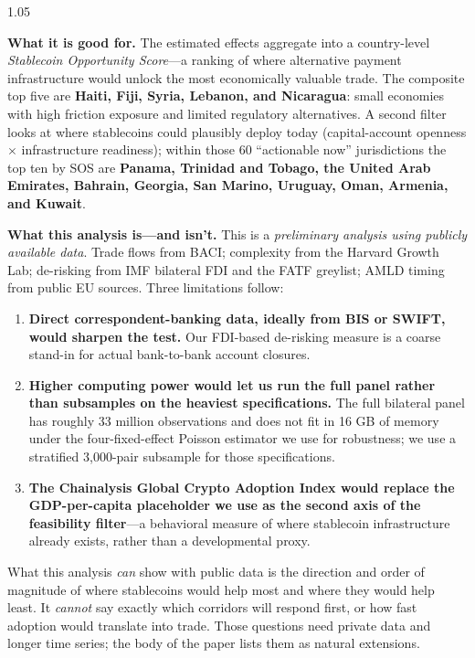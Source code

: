 \begin{spacing}{1.05}
\smallskip

\noindent\textbf{What it is good for.} The estimated effects aggregate into a country-level \emph{Stablecoin Opportunity Score}---a ranking of where alternative payment infrastructure would unlock the most economically valuable trade. The composite top five are \textbf{Haiti, Fiji, Syria, Lebanon, and Nicaragua}: small economies with high friction exposure and limited regulatory alternatives. A second filter looks at where stablecoins could plausibly deploy today (capital-account openness $\times$ infrastructure readiness); within those 60 ``actionable now'' jurisdictions the top ten by SOS are \textbf{Panama, Trinidad and Tobago, the United Arab Emirates, Bahrain, Georgia, San Marino, Uruguay, Oman, Armenia, and Kuwait}.

\smallskip

\noindent\textbf{What this analysis is---and isn't.} This is a \emph{preliminary analysis using publicly available data}. Trade flows from BACI; complexity from the Harvard Growth Lab; de-risking from IMF bilateral FDI and the FATF greylist; AMLD timing from public EU sources. Three limitations follow:

\begin{enumerate}[leftmargin=*, itemsep=0pt, topsep=2pt]
\item \textbf{Direct correspondent-banking data, ideally from BIS or SWIFT, would sharpen the test.} Our FDI-based de-risking measure is a coarse stand-in for actual bank-to-bank account closures.
\item \textbf{Higher computing power would let us run the full panel rather than subsamples on the heaviest specifications.} The full bilateral panel has roughly 33 million observations and does not fit in 16 GB of memory under the four-fixed-effect Poisson estimator we use for robustness; we use a stratified 3,000-pair subsample for those specifications.
\item \textbf{The Chainalysis Global Crypto Adoption Index would replace the GDP-per-capita placeholder we use as the second axis of the feasibility filter}---a behavioral measure of where stablecoin infrastructure already exists, rather than a developmental proxy.
\end{enumerate}

\smallskip

\noindent What this analysis \emph{can} show with public data is the direction and order of magnitude of where stablecoins would help most and where they would help least. It \emph{cannot} say exactly which corridors will respond first, or how fast adoption would translate into trade. Those questions need private data and longer time series; the body of the paper lists them as natural extensions.

\end{spacing}

\newpage

